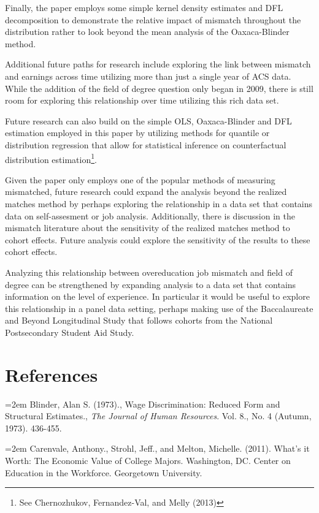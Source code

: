\documentclass[11pt]{article}
\theoremstyle{definition}
\begin{document}
Finally, the paper employs some simple kernel density estimates and DFL decomposition to demonstrate the relative impact of mismatch throughout the distribution rather to look beyond the mean analysis of the Oaxaca-Blinder method.  

Additional future paths for research include exploring the link between mismatch and earnings across time utilizing more than just a single year of ACS data.  While the addition of the field of degree question only began in 2009, there is still room for exploring this relationship over time utilizing this rich data set.

Future research can also build on the simple OLS, Oaxaca-Blinder and DFL estimation employed in this paper by utilizing methods for quantile or distribution regression that allow for statistical inference on counterfactual distribution estimation\footnote{See Chernozhukov, Fernandez-Val, and Melly (2013)}.  

Given the paper only employs one of the popular methods of measuring mismatched, future research could expand the analysis beyond the realized matches method by perhaps exploring the relationship in a data set that contains data on self-assesment or job analysis.  Additionally, there is discussion in the mismatch literature about the sensitivity of the realized matches method to cohort effects.  Future analysis could explore the sensitivity of the results to these cohort effects.  

Analyzing this relationship between overeducation job mismatch and field of degree can be strengthened by expanding analysis to a data set that contains information on the level of experience.  In particular it would be useful to explore this relationship in a panel data setting, perhaps making use of the Baccalaureate and Beyond Longitudinal Study that follows cohorts from the National Postsecondary Student Aid Study. 

\section*{References}

\hangindent=2em
Blinder, Alan S. (1973)., Wage Discrimination: Reduced Form and Structural Estimates.,  \textit{The Journal of Human Resources}. Vol. 8., No. 4 (Autumn, 1973). 436-455.

\vspace{2mm}
\noindent
\hangindent=2em
Carenvale, Anthony., Strohl, Jeff.,  and Melton, Michelle. (2011). What's it Worth: The Economic Value of College Majors. Washington, DC. Center on Education in the Workforce. Georgetown University.
\end{document}
